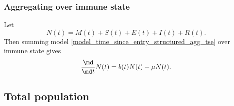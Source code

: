 \documentclass{jpmarticle}
\begin{document}
\subsubsection{Aggregating over immune state}

Let
\begin{equation}
  N(t)
  = M(t) + S(t) + E(t) + I(t) + R(t).
\end{equation}
Then summing model \eqref{model_time_since_entry_structured_agg_tse}
over immune state gives
\begin{equation}
  \label{model_time_since_entry_structured_agg_tse_state}
  \frac{\md}{\md t} N(t)
  = b(t) N(t) - \mu N(t).
\end{equation}


\subsection{Total population}
\end{document}
